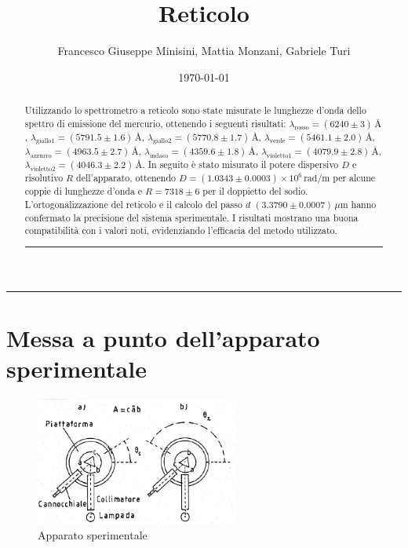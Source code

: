 \documentclass[a4paper,12pt]{article}
\title{Reticolo}
\author{Francesco Giuseppe Minisini, Mattia Monzani, Gabriele Turi}
\date{\today}
\begin{document}
\maketitle
\hrule
\vspace{9pt}
\begin{abstract}
    \noindent
    Utilizzando lo spettrometro a reticolo sono state misurate le lunghezze d’onda dello spettro di emissione del mercurio, ottenendo i seguenti risultati: \( \lambda_{\text{rosso}} = (6240 \pm 3) \, \text{\AA} \), \( \lambda_{\text{giallo1}} = (5791.5 \pm 1.6) \, \text{\AA} \), \( \lambda_{\text{giallo2}} = (5770.8 \pm 1.7) \, \text{\AA} \), \( \lambda_{\text{verde}} = (5461.1 \pm 2.0) \, \text{\AA} \), \( \lambda_{\text{azzurro}} = (4963.5 \pm 2.7) \, \text{\AA} \), \( \lambda_{\text{indaco}} = (4359.6 \pm 1.8) \, \text{\AA} \), \( \lambda_{\text{violetto1}} = (4079.9 \pm 2.8) \, \text{\AA} \), \( \lambda_{\text{violetto2}} = (4046.3 \pm 2.2) \, \text{\AA} \). 
    In seguito è stato misurato il potere dispersivo \( D \) e risolutivo \( R \) dell’apparato, ottenendo \( D = (1.0343 \pm 0.0003) \times 10^6 \, \text{rad/m} \) per alcune coppie di lunghezze d'onda e \( R = 7318 \pm 6 \) per il doppietto del sodio. L'ortogonalizzazione del reticolo e il calcolo del passo \( d \) \((3.3790 \pm 0.0007) \, \mu\text{m}\) hanno confermato la precisione del sistema sperimentale. I risultati mostrano una buona compatibilità con i valori noti, evidenziando l'efficacia del metodo utilizzato.
\vspace{20pt}
\hrule
\end{abstract}
\vspace{2 pt}


\section{Messa a punto dell'apparato sperimentale}

\begin{figure}[H]
    \centering
    \includegraphics[width=0.6\textwidth]{image.png}
    \caption{Apparato sperimentale}
    \label{fig:camera_millikan}
\end{figure}
\end{document}
